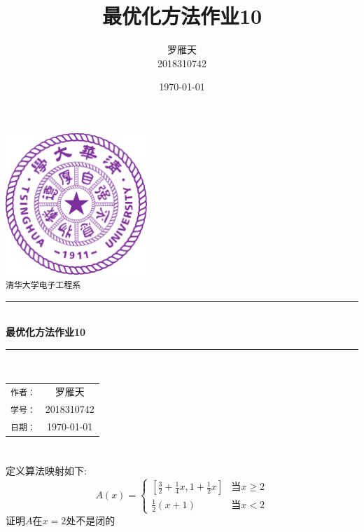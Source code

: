 \documentclass[a4paper]{article}
\title{最优化方法作业10}
\author{罗雁天 \\
2018310742}
\date{\today}
\begin{document}
\newcommand{\HRule}{\rule{\linewidth}{0.5mm}}
\begin{titlepage}
	\begin{center}
		\includegraphics[width=0.4\textwidth]{Tsinghua2.png}\\[1cm]
		\textsc{\Large \texttt{清华大学电子工程系}}\\[1cm]
		\HRule \\[1cm]
		{\Huge \bfseries 最优化方法作业10}\\[0.4cm]
		\HRule \\[3.5cm]
		\begin{minipage}{0.4\textwidth}
			\begin{center}
				\Large
				\begin{tabular}{cc}
					\texttt{作者：} & 罗雁天 \\[0.5cm]
					\texttt{学号：} & 2018310742 \\[0.5cm]
					\texttt{日期：} & \today
				\end{tabular}
			\end{center}
		\end{minipage}
		\vfill
	\end{center}
\end{titlepage}

\section{}
定义算法映射如下:
\begin{equation}
A(x)=\left\{
\begin{array}{cc}
\left[\frac{3}{2}+\frac{1}{4}x,1+\frac{1}{2}x\right] & \mbox{当}x\ge 2 \\
\frac{1}{2}(x+1) & \mbox{当}x<2
\end{array}
\right.
\end{equation}
证明$A$在$x=2$处不是闭的
\end{document}

